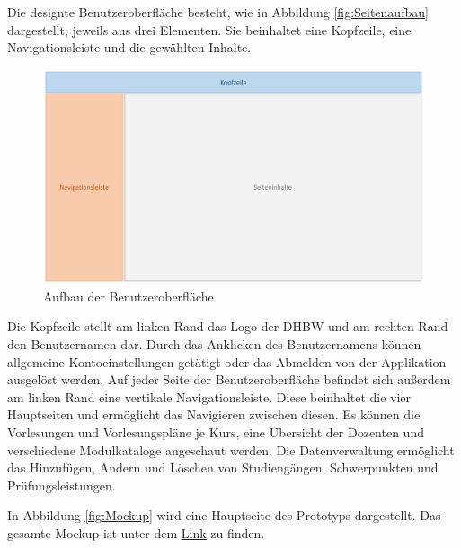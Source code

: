 Die designte Benutzeroberfläche besteht, wie in Abbildung \vref{fig:Seitenaufbau} dargestellt, jeweils aus drei Elementen.
Sie beinhaltet eine Kopfzeile, eine Navigationsleiste und die gewählten Inhalte.
\begin{figure}[h]
	\centering 
	\includegraphics[width=\textwidth]{img/Seitenaufbau.pdf}
	\captionsetup{format=hang}
	\caption[Aufbau der Benutzeroberfläche]{\label{fig:Seitenaufbau}Aufbau der Benutzeroberfläche}
\end{figure}
Die Kopfzeile stellt am linken Rand das Logo der \ac{DHBW} und am rechten Rand den Benutzernamen dar.
Durch das Anklicken des Benutzernamens können allgemeine Kontoeinstellungen getätigt oder das Abmelden von der Applikation ausgelöst werden.
Auf jeder Seite der Benutzeroberfläche befindet sich außerdem am linken Rand eine vertikale Navigationsleiste.
Diese beinhaltet die vier Hauptseiten und ermöglicht das Navigieren zwischen diesen.
Es können die Vorlesungen und Vorlesungspläne je Kurs, eine Übersicht der Dozenten und verschiedene Modulkataloge angeschaut werden. Die Datenverwaltung ermöglicht das Hinzufügen, Ändern und Löschen von Studiengängen, Schwerpunkten und Prüfungsleistungen.

In Abbildung \ref{fig:Mockup} wird eine Hauptseite des Prototyps dargestellt. Das gesamte Mockup ist unter dem \underline{\href{https://www.figma.com/proto/WZp01tmSA4nxDskhnfqv3x/Fourth-Prototype?node-id=1\%3A2\&scaling=contain}{Link}} zu finden.

